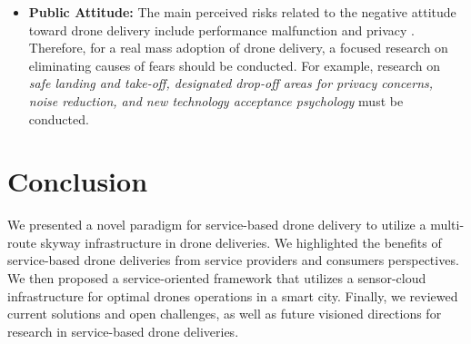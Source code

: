 \documentclass[conference]{IEEEtran}
\begin{document}
\begin{itemize}

    \item \textbf{Public Attitude:} The main perceived risks related to the negative attitude toward drone delivery include performance malfunction and privacy \cite{yoo2018drone}. Therefore, for a real mass adoption of drone delivery, a focused research on eliminating causes of fears should be conducted. For example, research on \textit{safe landing and take-off, designated drop-off areas for privacy concerns, noise reduction, and new technology acceptance psychology} must be conducted.
    
    
\end{itemize}







   





\section{Conclusion}
We presented a novel paradigm for service-based drone delivery to utilize a multi-route skyway infrastructure in drone deliveries. We highlighted the benefits of service-based drone deliveries from service providers and consumers perspectives. We then proposed a service-oriented framework that utilizes a sensor-cloud infrastructure for optimal drones operations in a smart city. Finally, we reviewed current solutions and open challenges, as well as future visioned directions for research in service-based drone deliveries. 
\end{document}
